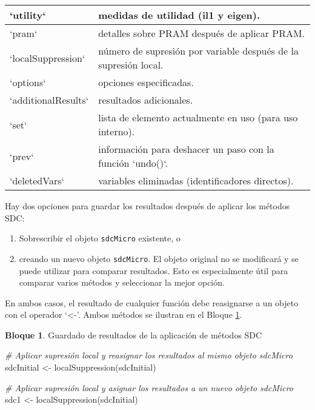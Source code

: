 \documentclass[
]{book}
\newenvironment{Shaded}{\begin{snugshade}}{\end{snugshade}}
\newcommand{\CommentTok}[1]{\textcolor[rgb]{0.56,0.35,0.01}{\textit{#1}}}
\newcommand{\FunctionTok}[1]{\textcolor[rgb]{0.00,0.00,0.00}{#1}}
\newcommand{\NormalTok}[1]{#1}
\newcommand{\OtherTok}[1]{\textcolor[rgb]{0.56,0.35,0.01}{#1}}
\providecommand{\tightlist}{%
  \setlength{\itemsep}{0pt}\setlength{\parskip}{0pt}}
\theoremstyle{definition}
\theoremstyle{definition}
\newtheorem{example}{Bloque}[chapter]
\theoremstyle{definition}
\theoremstyle{definition}
\theoremstyle{remark}
\begin{document}
\begin{table}
\begin{tabular}[t]{l|l}
\hline
`utility` & medidas de utilidad (il1 y eigen).\\
\hline
`pram` & detalles sobre PRAM después de aplicar PRAM.\\
\hline
`localSuppression` & número de supresión por variable después de la supresión local.\\
\hline
`options` & opciones especificadas.\\
\hline
`additionalResults` & resultados adicionales.\\
\hline
`set` & lista de elemento actualmente en uso (para uso interno).\\
\hline
`prev` & información para deshacer un paso con la función `undo()`.\\
\hline
`deletedVars` & variables eliminadas (identificadores directos).\\
\hline
\end{tabular}
\end{table}

Hay dos opciones para guardar los resultados después de aplicar los métodos SDC:

\begin{enumerate}
\def\labelenumi{\arabic{enumi}.}
\tightlist
\item
  Sobrescribir el objeto \texttt{sdcMicro} existente, o
\item
  creando un nuevo objeto \texttt{sdcMicro}. El objeto original no se modificará y se puede utilizar para comparar resultados. Esto es especialmente útil para comparar varios métodos y seleccionar la mejor opción.
\end{enumerate}

En ambos casos, el resultado de cualquier función debe reasignarse a un objeto con el operador `\textless-'. Ambos métodos se ilustran en el Bloque \ref{exm:bloqueMicro10}.

\begin{example}
\protect\hypertarget{exm:bloqueMicro10}{}\label{exm:bloqueMicro10}Guardado de resultados de la aplicación de métodos SDC
\end{example}

\begin{Shaded}
\begin{Highlighting}[]
\CommentTok{\# Aplicar supresión local y reasignar los resultados al mismo objeto sdcMicro}
\NormalTok{sdcInitial }\OtherTok{\textless{}{-}} \FunctionTok{localSuppression}\NormalTok{(sdcInitial)}

\CommentTok{\# Aplicar supresión local y asignar los resultados a un nuevo objeto sdcMicro}
\NormalTok{sdc1 }\OtherTok{\textless{}{-}} \FunctionTok{localSuppression}\NormalTok{(sdcInitial)}
\end{Highlighting}
\end{Shaded}
\end{document}
